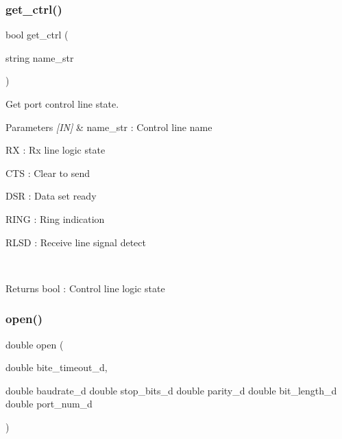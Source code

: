 \subsubsection{get\_ctrl()}
{\footnotesize\ttfamily bool get\+\_\+ctrl (\begin{DoxyParamCaption}\item[{string}]{name\+\_\+str }\end{DoxyParamCaption})}



Get port control line state. 


\begin{DoxyCode}{0}
\end{DoxyCode}



\begin{DoxyParams}{Parameters}
{\em \mbox{[}\+I\+N\mbox{]}} & name\+\_\+str \+: Control line name \begin{DoxyItemize}
\item RX \+: Rx line logic state \item C\+TS \+: Clear to send \item D\+SR \+: Data set ready \item R\+I\+NG \+: Ring indication \item R\+L\+SD \+: Receive line signal detect \end{DoxyItemize}
\\
\hline
\end{DoxyParams}
\begin{DoxyReturn}{Returns}
bool \+: Control line logic state 
\end{DoxyReturn}
\mbox{\label{classuart_ad3c901fe01e5eb46c89975a96911e0fc}} 
\subsubsection{open()}
{\footnotesize\ttfamily double open (\begin{DoxyParamCaption}\item[{double}]{bite\+\_\+timeout\+\_\+d,  }\item[{double baudrate\+\_\+d double stop\+\_\+bits\+\_\+d double parity\+\_\+d double bit\+\_\+length\+\_\+d double}]{port\+\_\+num\+\_\+d }\end{DoxyParamCaption})}



